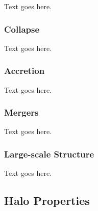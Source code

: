 Text goes here.



\subsubsection{Collapse}
\label{subsubsec:early_universe--dm_halo_formation--collapse}


Text goes here.



\subsubsection{Accretion}
\label{subsubsec:early_universe--dm_halo_formation--accretion}


Text goes here.



\subsubsection{Mergers}
\label{subsubsec:early_universe--dm_halo_formation--mergers}


Text goes here.



\subsubsection{Large-scale Structure}
\label{subsubsec:early_universe--dm_halo_formation--large-scale_structure}


Text goes here.




\subsection{Halo Properties}
\label{subsec:early_universe--halo_properties}


